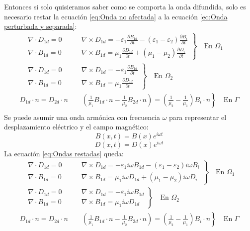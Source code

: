 \documentclass[11pt]{article}
\begin{document}
Entonces si solo quisieramos saber como se comporta la onda difundida, solo es necesario restar la ecuación \eqref{eq:Onda no afectada} a la ecuación \eqref{eq:Onda perturbada y separada}:
\begin{equation}
\label{eq:Ondas restadas}
\begin{split}
\left.
\begin{aligned}
&\nabla\cdot D_{1d}= 0\qquad & \nabla\times D_{1d}= -\varepsilon_1\frac{\partial B_{1d}}{\partial t}-(\varepsilon_1-\varepsilon	_2)\frac{\partial B_i}{\partial t}\\
&\nabla\cdot B_{1d} = 0\qquad &  \nabla\times B_{1d}= \mu_1\frac{\partial D_{1d}}{\partial t}+(\mu_1-\mu_2)\frac{\partial D_i}{\partial t}
\end{aligned}
\right\}
\quad\text{En }\Omega_1\\
\left.
\begin{aligned}
&\nabla\cdot D_{1d}= 0\qquad & \nabla\times D_{1d}= -\varepsilon_1\frac{\partial B_{1d}}{\partial t}\\
&\nabla\cdot B_{1d} = 0\qquad &  \nabla\times B_{1d}= \mu_1\frac{\partial D_{1d}}{\partial t}
\end{aligned}
\right\}
\quad\text{En }\Omega_2\\
\left. 
D_{1d}\cdot n=D_{2d}\cdot n \qquad \left(\frac{1}{\mu_1}B_{1d}\cdot n-\frac{1}{\mu_2}B_{2d}\cdot n\right)=\left(\frac{1}{\mu_2}-\frac{1}{\mu_1}\right)B_i\cdot n
\right\}
\quad\text{En }\Gamma\\
\end{split}
\end{equation}
Se puede asumir una onda armónica con frecuencia $\omega$ para representar el desplazamiento eléctrico y el campo magnético:
$$B(x,t)=B(x)e^{i\omega t}$$
$$D(x,t)=D(x)e^{i\omega t}$$
La ecuación \eqref{eq:Ondas restadas} queda:
\begin{equation}
\label{eq:Ondas armonicas restadas }
\begin{split}
\left.
\begin{aligned}
&\nabla\cdot D_{1d}= 0\qquad & \nabla\times D_{1d}= -\varepsilon_1i\omega B_{1d}-(\varepsilon_1-\varepsilon	_2) i\omega B_i\\
&\nabla\cdot B_{1d} = 0\qquad &  \nabla\times B_{1d}= \mu_1 i\omega D_{1d}+(\mu_1-\mu_2)i\omega D_i
\end{aligned}
\right\}
\quad\text{En }\Omega_1\\
\left.
\begin{aligned}
&\nabla\cdot D_{1d}= 0\qquad & \nabla\times D_{1d}= -\varepsilon_1 i\omega B_{1d}\\
&\nabla\cdot B_{1d} = 0\qquad &  \nabla\times B_{1d}= \mu_1 i\omega D_{1d}
\end{aligned}
\right\}
\quad\text{En }\Omega_2\\
\left. 
D_{1d}\cdot n=D_{2d}\cdot n \qquad \left(\frac{1}{\mu_1}B_{1d}\cdot n-\frac{1}{\mu_2}B_{2d}\cdot n\right)=\left(\frac{1}{\mu_2}-\frac{1}{\mu_1}\right)B_i\cdot n
\right\}
\quad\text{En }\Gamma\\
\end{split}
\end{equation}
\end{document}
